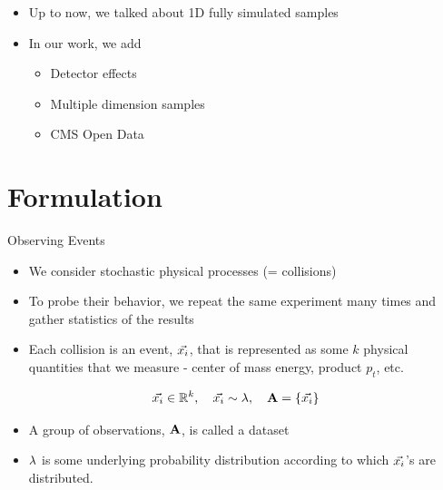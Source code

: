 \documentclass[notheorems]{beamer}
\begin{document}
\begin{frame}
    \begin{itemize}
        \item Up to now, we talked about 1D fully simulated samples
        \item In our work, we add
        \begin{itemize}
            \item Detector effects
            \item Multiple dimension samples
            \item CMS Open Data
        \end{itemize}
    \end{itemize}
\end{frame}

\section{Formulation}

\begin{frame}{Observing Events}
    \begin{itemize}
        \item We consider stochastic physical processes (= collisions)
        \item To probe their behavior, we repeat the same experiment many times and gather statistics of the results
        \item Each collision is an event, ${\vec{{x}_i}}$, that is represented as some $k$ physical quantities that we measure - center of mass energy, product $p_t$, etc.
    \end{itemize}
    \begin{equation}
        {\vec{{x}_i}} \in \mathbb{R}^k, \quad {\vec{{x}_i}} \sim {\lambda}, \quad {\mathbf{A}} = \{{\vec{{x}_i}}\}
    \end{equation}
    \begin{itemize}
        \item A group of observations, ${\mathbf{A}}$, is called a dataset
        \item ${\lambda}$ is some underlying probability distribution according to which ${\vec{{x}_i}}$'s are distributed.
    \end{itemize}
\end{frame}
\end{document}
